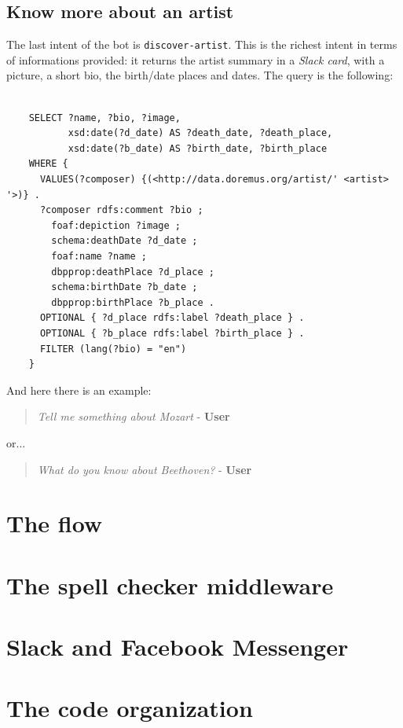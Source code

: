 \documentclass[a4paper,12pt]{report}
\begin{document}
	\subsection{Know more about an artist}
	The last intent of the bot is \texttt{discover-artist}. This is the richest intent in terms of informations provided: it returns the artist summary in a \textit{Slack card}, with a picture, a short bio, the birth/date places and dates.
	The query is the following:
	\begin{lstlisting}
	
	SELECT ?name, ?bio, ?image,
	       xsd:date(?d_date) AS ?death_date, ?death_place,
	       xsd:date(?b_date) AS ?birth_date, ?birth_place
	WHERE {
	  VALUES(?composer) {(<http://data.doremus.org/artist/' <artist> '>)} .
	  ?composer rdfs:comment ?bio ;
	    foaf:depiction ?image ;
	    schema:deathDate ?d_date ;
	    foaf:name ?name ;
	    dbpprop:deathPlace ?d_place ;
	    schema:birthDate ?b_date ;
	    dbpprop:birthPlace ?b_place .
	  OPTIONAL { ?d_place rdfs:label ?death_place } .
	  OPTIONAL { ?b_place rdfs:label ?birth_place } .
	  FILTER (lang(?bio) = "en")
	}
	\end{lstlisting}
	And here there is an example:
	\begin{verse}
		\textit{Tell me something about Mozart} - \textbf{User}\\
	\end{verse}
	or...
	\begin{verse}
		\textit{What do you know about Beethoven?} - \textbf{User}\\
	\end{verse}

	\section{The flow}
	\section{The spell checker middleware}
	\section{Slack and Facebook Messenger}
	\section{The code organization}
	
\end{document}
